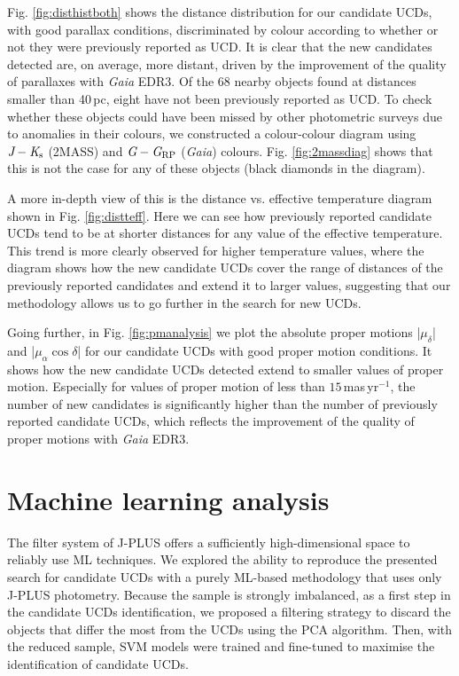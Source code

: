 Fig. \ref{fig:disthistboth} shows the distance distribution for our candidate UCDs, with good parallax conditions, discriminated by colour according to whether or not they were previously reported as UCD. It is clear that the new candidates detected are, on average, more distant, driven by the improvement of the quality of parallaxes with \textit{Gaia} EDR3. Of the 68 nearby objects found at distances smaller than 40\,pc, eight have not been previously reported as UCD. To check whether these objects could have been missed by other photometric surveys due to anomalies in their colours, we constructed a colour-colour diagram using \textit{$\textit{J}-\textit{K}_{\rm s}$} (2MASS) and $\textit{G}-\textit{G}_{\rm RP}$ (\textit{Gaia}) colours. Fig. \ref{fig:2massdiag} shows that this is not the case for any of these objects (black diamonds in the diagram).

A more in-depth view of this is the distance vs. effective temperature diagram shown in Fig. \ref{fig:distteff}. Here we can see how previously reported candidate UCDs tend to be at shorter distances for any value of the effective temperature. This trend is more clearly observed for higher temperature values, where the diagram shows how the new candidate UCDs cover the range of distances of the previously reported candidates and extend it to larger values, suggesting that our methodology allows us to go further in the search for new UCDs.

Going further, in Fig. \ref{fig:pmanalysis} we plot the absolute proper motions |$\mu_{\delta}$| and |$\mu_{\alpha}\cos{\delta}$| for our candidate UCDs with good proper motion conditions. It shows how the new candidate UCDs detected extend to smaller values of proper motion. Especially for values of proper motion of less than $15$\,mas\,yr$^{-1}$, the number of new candidates is significantly higher than the number of previously reported candidate UCDs, which reflects the improvement of the quality of proper motions with \textit{Gaia} EDR3.



\section{Machine learning analysis} \label{ml}

The filter system of J-PLUS offers a sufficiently high-dimensional space to reliably use ML techniques. We explored the ability to reproduce the presented search for candidate UCDs with a purely ML-based methodology that uses only J-PLUS photometry. Because the sample is strongly imbalanced, as a first step in the candidate UCDs identification, we proposed a filtering strategy to discard the objects that differ the most from the UCDs using the PCA algorithm. Then, with the reduced sample, SVM models were trained and fine-tuned to maximise the identification of candidate UCDs.

